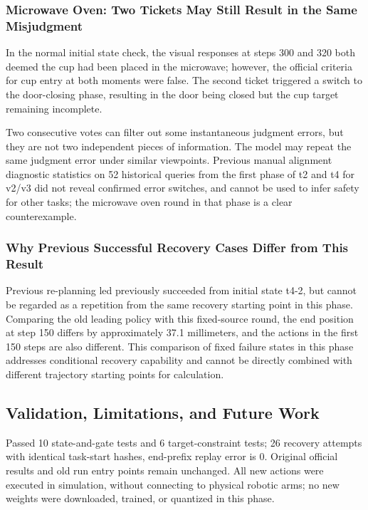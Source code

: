 \subsubsection{Microwave Oven: Two Tickets May Still Result in the Same Misjudgment}\label{s10-detail-11}

In the normal initial state check, the visual responses at steps 300 and 320 both deemed the cup had been placed in the microwave; however, the official criteria for cup entry at both moments were false. The second ticket triggered a switch to the door-closing phase, resulting in the door being closed but the cup target remaining incomplete.

Two consecutive votes can filter out some instantaneous judgment errors, but they are not two independent pieces of information. The model may repeat the same judgment error under similar viewpoints. Previous manual alignment diagnostic statistics on 52 historical queries from the first phase of t2 and t4 for v2/v3 did not reveal confirmed error switches, and cannot be used to infer safety for other tasks; the microwave oven round in that phase is a clear counterexample.

\subsubsection{Why Previous Successful Recovery Cases Differ from This Result}\label{s10-detail-12}

Previous re-planning led previously succeeded from initial state t4-2, but cannot be regarded as a repetition from the same recovery starting point in this phase. Comparing the old leading policy with this fixed-source round, the end position at step 150 differs by approximately 37.1 millimeters, and the actions in the first 150 steps are also different. This comparison of fixed failure states in this phase addresses conditional recovery capability and cannot be directly combined with different trajectory starting points for calculation.

\subsection{Validation, Limitations, and Future Work}\label{s10-detail-13}

Passed 10 state-and-gate tests and 6 target-constraint tests; 26 recovery attempts with identical task-start hashes, end-prefix replay error is 0. Original official results and old run entry points remain unchanged. All new actions were executed in simulation, without connecting to physical robotic arms; no new weights were downloaded, trained, or quantized in this phase.

